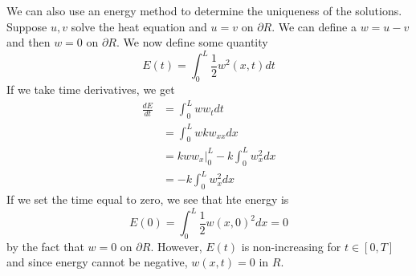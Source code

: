 \documentclass{article}
\newcommand{\od}[2]{\frac{d #1}{d #2}}
\theoremstyle{definition}
\begin{document}
We can also use an energy method to determine the uniqueness of the solutions. Suppose $u,v$ solve the heat equation and $u=v$ on $\partial R$. We can define a $w=u-v$ and then $w=0$ on $\partial R$. We now define some quantity 
\begin{equation*}
    E(t)=\int^L_0\frac{1}{2}w^2(x,t)dt
\end{equation*}
If we take time derivatives, we get 
\begin{equation*}
    \begin{split}
        \od{E}{t} &=\int^L_0ww_tdt \\
        &=\int^L_0 wkw_{xx}dx \\
        &=kww_x\bigg|^L_0 - k\int^L_0w_x^2dx\\
        &=-k\int^L_0w_x^2dx
    \end{split}
\end{equation*}
If we set the time equal to zero, we see that hte energy is 
\begin{equation*}
    E(0)=\int^L_0\frac{1}{2}w(x,0)^2dx =0
\end{equation*}
by the fact that $w=0$ on $\partial R$. However, $E(t)$ is non-increasing for $t\in [0,T]$ and since energy cannot be negative, $w(x,t)=0$ in $R$. 
\end{document}

